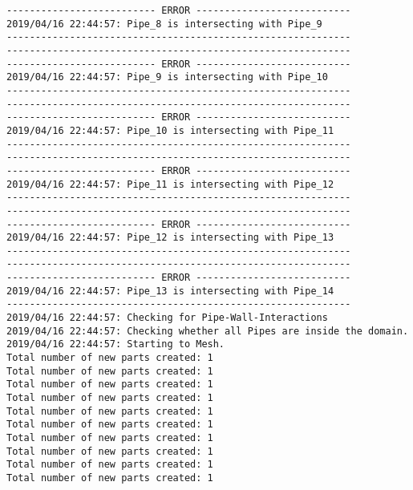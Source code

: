 \documentclass{article}
\begin{document}
{\begin{verbatim}
-------------------------- ERROR ---------------------------
2019/04/16 22:44:57: Pipe_8 is intersecting with Pipe_9
------------------------------------------------------------
------------------------------------------------------------
-------------------------- ERROR ---------------------------
2019/04/16 22:44:57: Pipe_9 is intersecting with Pipe_10
------------------------------------------------------------
------------------------------------------------------------
-------------------------- ERROR ---------------------------
2019/04/16 22:44:57: Pipe_10 is intersecting with Pipe_11
------------------------------------------------------------
------------------------------------------------------------
-------------------------- ERROR ---------------------------
2019/04/16 22:44:57: Pipe_11 is intersecting with Pipe_12
------------------------------------------------------------
------------------------------------------------------------
-------------------------- ERROR ---------------------------
2019/04/16 22:44:57: Pipe_12 is intersecting with Pipe_13
------------------------------------------------------------
------------------------------------------------------------
-------------------------- ERROR ---------------------------
2019/04/16 22:44:57: Pipe_13 is intersecting with Pipe_14
------------------------------------------------------------
2019/04/16 22:44:57: Checking for Pipe-Wall-Interactions
2019/04/16 22:44:57: Checking whether all Pipes are inside the domain.
2019/04/16 22:44:57: Starting to Mesh.
Total number of new parts created: 1
Total number of new parts created: 1
Total number of new parts created: 1
Total number of new parts created: 1
Total number of new parts created: 1
Total number of new parts created: 1
Total number of new parts created: 1
Total number of new parts created: 1
Total number of new parts created: 1
Total number of new parts created: 1
\end{verbatim}
}
\clearpage
\end{document}
